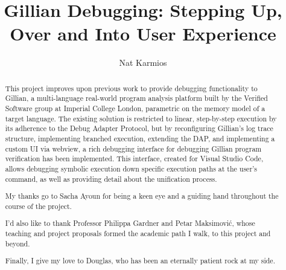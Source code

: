 \documentclass[a4paper, twoside]{report}
\title{Gillian Debugging: Stepping Up, Over and Into User Experience}
\author{Nat Karmios}
\begin{document}
\def\chapterautorefname{\normalcolor{Chapter}\color{blue}}
\def\sectionautorefname{\normalcolor{\S}\kern-0.7ex\color{blue}}
\def\subsectionautorefname{\normalcolor{\S}\kern-0.7ex\color{blue}}
\def\figureautorefname{\normalcolor{Figure}\color{blue}}
\def\lstnumberautorefname{\normalcolor{line}\color{blue}}
\newcommand{\sacha}[1]{\todo[color=green]{S: {#1}}}



\begin{abstract}
This project improves upon previous work to provide debugging functionality to
Gillian, a multi-language real-world program analysis platform built by the
Verified Software group at Imperial College London, parametric on the memory
model of a target language.
The existing solution is restricted to linear, step-by-step execution by its
adherence to the Debug Adapter Protocol, but by reconfiguring Gillian's log
trace structure, implementing branched execution, extending the DAP, and
implementing a custom UI via webview, a rich debugging interface for debugging
Gillian program verification has been implemented.
This interface, created for Visual Studio Code, allows debugging symbolic
execution down specific execution paths at the user's command, as well as
providing detail about the unification process.
\end{abstract}

\renewcommand{\abstractname}{Acknowledgements}
\begin{abstract}
My thanks go to Sacha Ayoun for being a keen eye and a guiding hand throughout
the course of the project.

I'd also like to thank Professor Philippa Gardner and Petar Maksimović,
whose teaching and project proposals formed the academic path I walk, to this
project and beyond.

Finally, I give my love to Douglas, who has been an eternally patient rock at my
side.
\end{abstract}

\listoftodos{}
\tableofcontents










\end{document}
